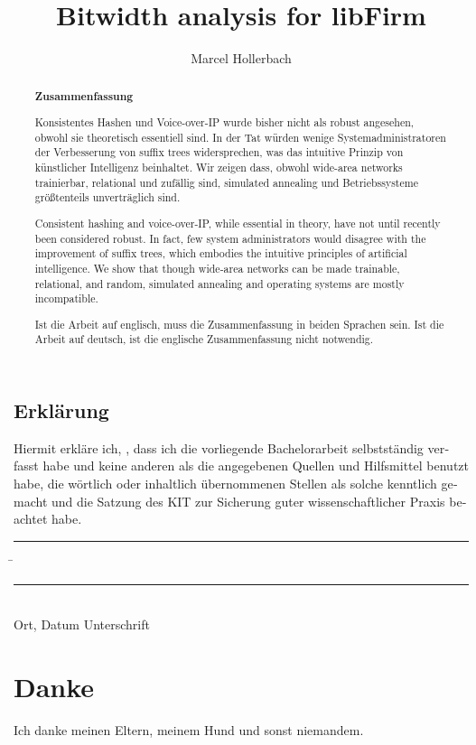 \documentclass[parskip=full,12pt,a4paper,twoside,headings=openright]{scrreprt}
\title{Bitwidth analysis for libFirm}
\author{Marcel Hollerbach}
\begin{document}
\begin{otherlanguage}{ngerman} %
\mytitlepage
\end{otherlanguage}

\begin{abstract}
\begin{center}\Huge\textbf{\textsf{Zusammenfassung}}
\end{center}
\vfill

Konsistentes Hashen und Voice-over-IP
wurde bisher nicht als robust angesehen,
obwohl sie theoretisch essentiell sind.
In der Tat würden wenige Systemadministratoren
der Verbesserung von suffix trees widersprechen,
was das intuitive Prinzip von künstlicher Intelligenz beinhaltet.
Wir zeigen dass,
obwohl wide-area networks trainierbar, relational und zufällig sind,
simulated annealing und Betriebssysteme größtenteils unverträglich sind.
\vfill

Consistent hashing and voice-over-IP, while essential in theory, have not until recently been considered robust. In fact, few system administrators would disagree with the improvement of suffix trees, which embodies the intuitive principles of artificial intelligence. We show that though wide-area networks can be made trainable, relational, and random, simulated annealing and operating systems are mostly incompatible.
\vfill

Ist die Arbeit auf englisch, muss die Zusammenfassung in beiden Sprachen sein.
Ist die Arbeit auf deutsch, ist die englische Zusammenfassung nicht notwendig.
\end{abstract}

\tableofcontents










\begin{otherlanguage}{ngerman}
\chapter*{Erklärung}
\pagestyle{empty}

  \vspace{20mm}
  Hiermit erkläre ich, \theauthor, dass ich die vorliegende Bachelorarbeit selbst\-ständig
verfasst habe und keine anderen als die angegebenen Quellen und Hilfsmittel
benutzt habe, die wörtlich oder inhaltlich übernommenen Stellen als solche kenntlich gemacht und
die Satzung des KIT zur Sicherung guter wissenschaftlicher Praxis beachtet habe.
  \vspace{20mm}
  \begin{tabbing}
  \rule{4cm}{.4pt}\hspace{1cm} \= \rule{7cm}{.4pt} \\
 Ort, Datum \> Unterschrift
  \end{tabbing}
\end{otherlanguage}

\chapter*{Danke}
\pagestyle{empty}

Ich danke meinen Eltern, meinem Hund und sonst niemandem.

\pagestyle{fancy}
\appendix


\end{document}
